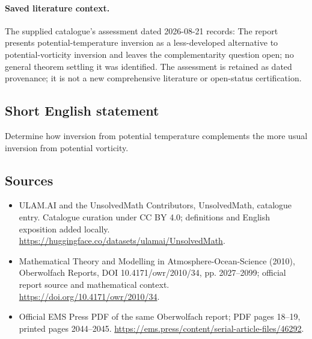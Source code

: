 \documentclass[11pt]{article}
\begin{document}
\paragraph{Saved literature context.} The supplied catalogue's assessment dated 2026-08-21 records: The report presents potential-temperature inversion as a less-developed alternative to potential-vorticity inversion and leaves the complementarity question open; no general theorem settling it was identified. The assessment is retained as dated provenance; it is not a new comprehensive literature or open-status certification.
\subsection{Short English statement}
Determine how inversion from potential temperature complements the more usual inversion from potential vorticity.
\subsection{Sources}
\begin{itemize}
\item[\hypertarget{source:statement:1}{S1}] ULAM.AI and the UnsolvedMath Contributors, UnsolvedMath, catalogue entry. Catalogue curation under CC BY 4.0; definitions and English exposition added locally.
\url{https://huggingface.co/datasets/ulamai/UnsolvedMath}.
\item[\hypertarget{source:statement:2}{S2}] Mathematical Theory and Modelling in Atmosphere-Ocean-Science (2010), Oberwolfach Reports, DOI 10.4171/owr/2010/34, pp. 2027--2099; official report source and mathematical context.
\url{https://doi.org/10.4171/owr/2010/34}.
\item[\hypertarget{source:statement:3}{S3}] Official EMS Press PDF of the same Oberwolfach report; PDF pages 18--19, printed pages 2044--2045.
\url{https://ems.press/content/serial-article-files/46292}.
\end{itemize}
\label{end:statement}
\end{document}
